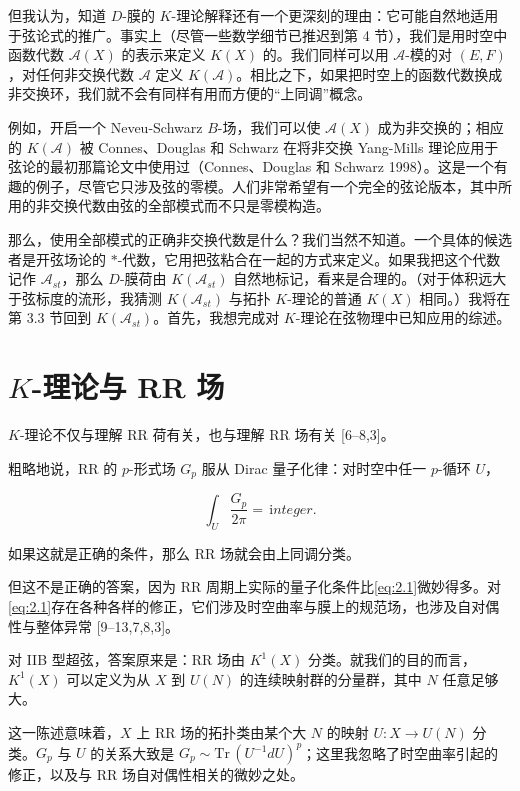 但我认为，知道 \(D\)-膜的 \(K\)-理论解释还有一个更深刻的理由：它可能自然地适用于弦论式的推广。事实上（尽管一些数学细节已推迟到第 4 节），我们是用时空中函数代数 \(\mathcal{A}(X)\) 的表示来定义 \(K(X)\) 的。我们同样可以用 \(\mathcal{A}\)-模的对 \((E,F)\)，对任何非交换代数 \(\mathcal{A}\) 定义 \(K(\mathcal{A})\)。相比之下，如果把时空上的函数代数换成非交换环，我们就不会有同样有用而方便的“上同调”概念。

例如，开启一个 Neveu-Schwarz \(B\)-场，我们可以使 \(\mathcal{A}(X)\) 成为非交换的；相应的 \(K(\mathcal{A})\) 被 Connes、Douglas 和 Schwarz 在将非交换 Yang-Mills 理论应用于弦论的最初那篇论文中使用过（Connes、Douglas 和 Schwarz 1998）。这是一个有趣的例子，尽管它只涉及弦的零模。人们非常希望有一个完全的弦论版本，其中所用的非交换代数由弦的全部模式而不只是零模构造。

那么，使用全部模式的正确非交换代数是什么？我们当然不知道。一个具体的候选者是开弦场论的 \(*\)-代数，它用把弦粘合在一起的方式来定义。如果我把这个代数记作 \(\mathcal{A}_{st}\)，那么 \(D\)-膜荷由 \(K(\mathcal{A}_{st})\) 自然地标记，看来是合理的。（对于体积远大于弦标度的流形，我猜测 \(K(\mathcal{A}_{st})\) 与拓扑 \(K\)-理论的普通 \(K(X)\) 相同。）我将在第 3.3 节回到 \(K(\mathcal{A}_{st})\)。首先，我想完成对 \(K\)-理论在弦物理中已知应用的综述。

\section{\texorpdfstring{\(K\)-理论与 RR 场}{K-理论与 RR 场}}

\(K\)-理论不仅与理解 RR 荷有关，也与理解 RR 场有关 [6--8,3]。

粗略地说，RR 的 \(p\)-形式场 \(G_p\) 服从 Dirac 量子化律：对时空中任一 \(p\)-循环 \(U\)，

\begin{equation}\tag{2.1}\label{eq:2.1}
\int_U\frac{G_p}{2\pi}=\,{\mathrm integer}.
\end{equation}

如果这就是正确的条件，那么 RR 场就会由上同调分类。

但这不是正确的答案，因为 RR 周期上实际的量子化条件比\eqref{eq:2.1}微妙得多。对\eqref{eq:2.1}存在各种各样的修正，它们涉及时空曲率与膜上的规范场，也涉及自对偶性与整体异常 [9--13,7,8,3]。

对 IIB 型超弦，答案原来是：RR 场由 \(K^1(X)\) 分类。就我们的目的而言，\(K^1(X)\) 可以定义为从 \(X\) 到 \(U(N)\) 的连续映射群的分量群，其中 \(N\) 任意足够大。

这一陈述意味着，\(X\) 上 RR 场的拓扑类由某个大 \(N\) 的映射 \(U:X\to U(N)\) 分类。\(G_p\) 与 \(U\) 的关系大致是 \(G_p\sim \mathrm{Tr}\,(U^{-1}dU)^p\)；这里我忽略了时空曲率引起的修正，以及与 RR 场自对偶性相关的微妙之处。


